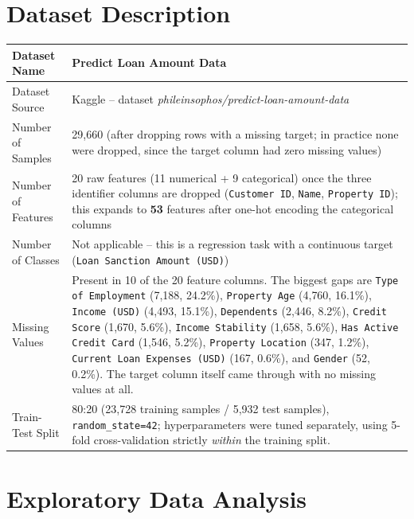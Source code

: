 \documentclass[12pt,a4paper]{article}
\begin{document}
\section{Dataset Description}\label{sec:dataset}
\begin{longtable}{|p{6cm}|p{8cm}|}
\hline
Dataset Name & Predict Loan Amount Data \\ \hline
Dataset Source & Kaggle -- dataset \textit{phileinsophos/predict-loan-amount-data} \\ \hline
Number of Samples & 29{,}660 (after dropping rows with a missing target; in practice none were dropped, since the target column had zero missing values) \\ \hline
Number of Features & 20 raw features (11 numerical + 9 categorical) once the three identifier columns are dropped (\texttt{Customer ID}, \texttt{Name}, \texttt{Property ID}); this expands to \textbf{53} features after one-hot encoding the categorical columns \\ \hline
Number of Classes & Not applicable -- this is a regression task with a continuous target (\texttt{Loan Sanction Amount (USD)}) \\ \hline
Missing Values & Present in 10 of the 20 feature columns. The biggest gaps are \texttt{Type of Employment} (7{,}188, 24.2\%), \texttt{Property Age} (4{,}760, 16.1\%), \texttt{Income (USD)} (4{,}493, 15.1\%), \texttt{Dependents} (2{,}446, 8.2\%), \texttt{Credit Score} (1{,}670, 5.6\%), \texttt{Income Stability} (1{,}658, 5.6\%), \texttt{Has Active Credit Card} (1{,}546, 5.2\%), \texttt{Property Location} (347, 1.2\%), \texttt{Current Loan Expenses (USD)} (167, 0.6\%), and \texttt{Gender} (52, 0.2\%). The target column itself came through with no missing values at all. \\ \hline
Train-Test Split & 80:20 (23{,}728 training samples / 5{,}932 test samples), \texttt{random\_state=42}; hyperparameters were tuned separately, using 5-fold cross-validation strictly \textit{within} the training split. \\ \hline
\end{longtable}

\section{Exploratory Data Analysis}\label{sec:eda}
\end{document}

